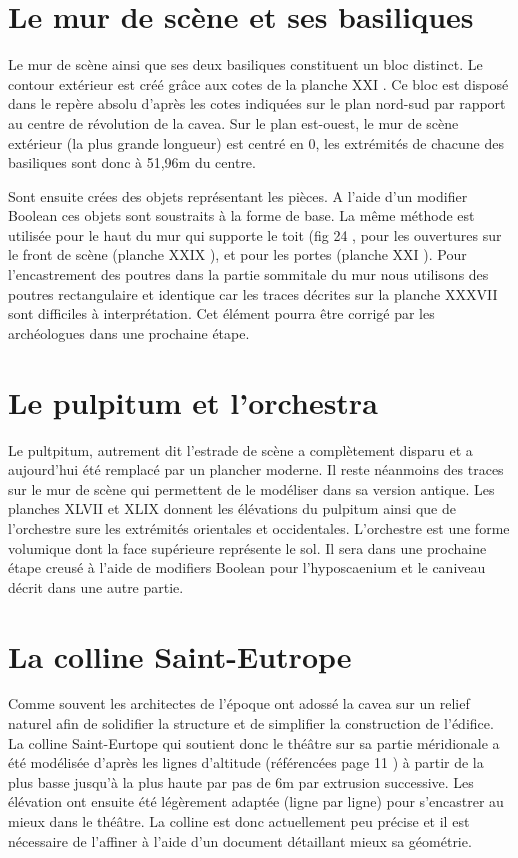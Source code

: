 		\section{Le mur de scène et ses basiliques}

Le mur de scène ainsi que ses deux basiliques constituent un bloc distinct. Le contour extérieur est créé grâce aux cotes de la planche XXI \cite{ref2}. Ce bloc est disposé dans le repère absolu d'après les cotes indiquées sur le plan nord-sud par rapport au centre de révolution de la cavea. Sur le plan est-ouest, le mur de scène extérieur (la plus grande longueur) est centré en 0, les extrémités de chacune des basiliques sont donc à 51,96m du centre.

Sont ensuite crées des objets représentant les pièces. A l'aide d'un modifier Boolean ces objets sont soustraits à la forme de base. La même méthode est utilisée pour le haut du mur qui supporte le toit (fig 24 \cite{ref},  pour les ouvertures sur le front de scène (planche XXIX \cite{ref2}), et pour les portes (planche XXI \cite{ref2}). Pour l'encastrement des poutres dans la partie sommitale du mur nous utilisons des poutres rectangulaire et identique car les traces décrites sur la planche XXXVII \cite{ref2} sont difficiles à interprétation. Cet élément pourra être corrigé par les archéologues dans une prochaine étape.

		\section{Le pulpitum et l'orchestra} 

Le pultpitum, autrement dit l'estrade de scène a complètement disparu et a aujourd'hui été remplacé par un plancher moderne. Il reste néanmoins des traces sur le mur de scène qui permettent de le modéliser dans sa version antique. Les planches XLVII et XLIX \cite{ref2} donnent les élévations du pulpitum ainsi que de l'orchestre sure les extrémités orientales et occidentales. L'orchestre est une forme volumique dont la face supérieure représente le sol. Il sera dans une prochaine étape creusé à l'aide de modifiers Boolean pour l'hyposcaenium et le caniveau décrit dans une autre partie.

		\section{La colline Saint-Eutrope} 
Comme souvent les architectes de l'époque ont adossé la cavea sur un relief naturel afin de solidifier la structure et de simplifier la construction de l'édifice. La colline Saint-Eurtope qui soutient donc le théâtre sur sa partie méridionale a été modélisée d'après les lignes d'altitude (référencées page 11 \cite{ref}) à partir de la plus basse jusqu'à la plus haute par pas de 6m par extrusion successive. Les élévation ont ensuite été légèrement adaptée (ligne par ligne) pour s'encastrer au mieux dans le théâtre. La colline est donc actuellement peu précise et il est nécessaire de l'affiner à l'aide d'un document détaillant mieux sa géométrie.

